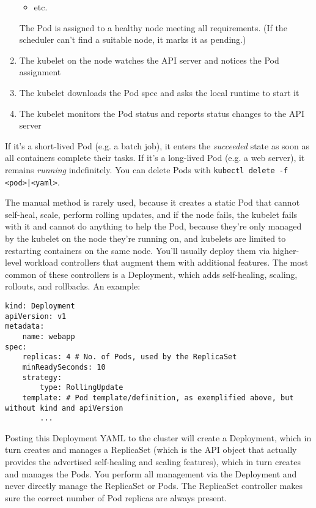 \documentclass[8pt, table, xcdraw]{article}%
\begin{document}
\begin{enumerate}
\begin{itemize}
		\item etc.
    \end{itemize}
    The Pod is assigned to a healthy node meeting all requirements. (If the scheduler can’t find a suitable node, it marks it as pending.)
    \item The kubelet on the node watches the API server and notices the Pod assignment
    \item The kubelet downloads the Pod spec and asks the local runtime to start it
    \item The kubelet monitors the Pod status and reports status changes to the API server
\end{enumerate}

If it’s a short-lived Pod (e.g. a batch job), it enters the \emph{succeeded} state as soon as all containers complete their tasks. If it’s a long-lived Pod (e.g. a web server), it remains \emph{running} indefinitely. You can delete Pods with \lstinline{kubectl delete -f <pod>|<yaml>}.

The manual method is rarely used, because it creates a static Pod that cannot self-heal, scale, perform rolling updates, and if the node fails, the kubelet fails with it and cannot do anything to help the Pod, because they’re only managed by the kubelet on the node they’re running on, and kubelets are limited to restarting containers on the same node. You’ll usually deploy them via higher-level workload controllers that augment them with additional features. The most common of these controllers is a Deployment, which adds self-healing, scaling, rollouts, and rollbacks. An example:

\begin{lstlisting}
kind: Deployment
apiVersion: v1
metadata:
	name: webapp
spec:
    replicas: 4 # No. of Pods, used by the ReplicaSet
    minReadySeconds: 10
    strategy:
        type: RollingUpdate
    template: # Pod template/definition, as exemplified above, but without kind and apiVersion
        ...
\end{lstlisting}

Posting this Deployment YAML to the cluster will create a Deployment, which in turn creates and manages a ReplicaSet (which is the API object that actually provides the advertised self-healing and scaling features), which in turn creates and manages the Pods. You perform all management via the Deployment and never directly manage the ReplicaSet or Pods. The ReplicaSet controller makes sure the correct number of Pod replicas are always present.
\end{document}
